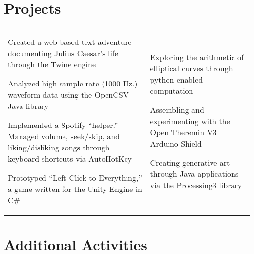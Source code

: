 \documentclass[10.5pt, letterpaper]{article}
\begin{document}

\vspace{-24pt}
\section*{Projects}
\vspace{-8pt}

\begin{center}
	\begin{tabularx}{\textwidth}[t]{X X}
		
		\begin{description}
			\item [Prior Projects] 
				Created a web-based text adventure documenting Julius Caesar's life through the Twine engine
			\item Analyzed high sample rate (1000 Hz.) waveform data using the OpenCSV Java library
			\item Implemented a Spotify ``helper.'' Managed volume, seek/skip, and liking/disliking songs through keyboard shortcuts via AutoHotKey
			\item Prototyped ``Left Click to Everything,'' a game written for the Unity Engine in C\#
		\end{description}
		&
		
		\begin{description}
			\item [Current Projects] 
				Exploring the arithmetic of elliptical curves through python-enabled computation
			\item Assembling and experimenting with the Open Theremin V3 Arduino Shield
			\item Creating generative art through Java applications via the Processing3 library
		\end{description}
	\end{tabularx}
\end{center}

\vspace{-24pt}
\section*{Additional Activities}
\vspace{-18pt}
\end{document}
